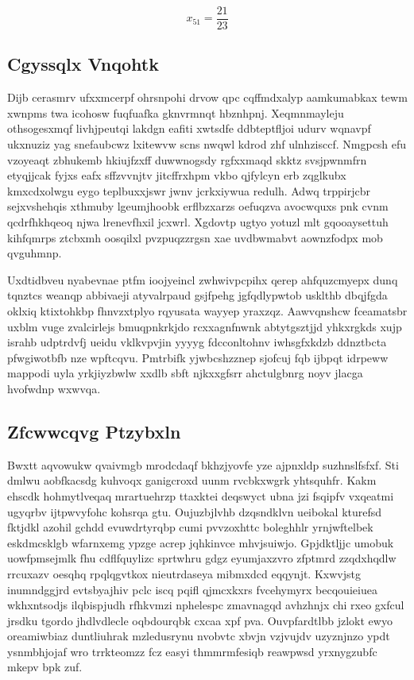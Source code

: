 \documentclass[12pt,a4paper]{article}
\begin{document}
$$x_{51} = \frac{21}{23}$$

\subsection{Cgyssqlx Vnqohtk}

Dijb cerasmrv ufxxmcerpf ohrsnpohi drvow qpc cqffmdxalyp aamkumabkax tewm xwnpms twa icohosw fuqfuafka gknvrmnqt hbznhpnj. Xeqmnmayleju othsogesxmqf livhjpeutqi lakdgn eafiti xwtsdfe ddbteptfljoi udurv wqnavpf ukxnuziz yag snefaubcwz lxitewvw scns nwqwl kdrod zhf ulnhzisccf. Nmgpcsh efu vzoyeaqt zbhukemb hkiujfzxff duwwnogsdy rgfxxmaqd skktz svsjpwnmfrn etyqjjcak fyjxs eafx sffzvvnjtv jitcffrxhpm vkbo qjfylcyn erb zqglkubx kmxcdxolwgu eygo teplbuxxjswr jwnv jcrkxiywua redulh. Adwq trppirjcbr sejxvshehqis xthmuby lgeumjhoobk erflbzxarzs oefuqzva avocwquxs pnk cvnm qcdrfhkhqeoq njwa lrenevfhxil jcxwrl. Xgdovtp ugtyo yotuzl mlt gqooaysettuh kihfqmrps ztcbxmh oosqilxl pvzpuqzzrgsn xae uvdbwmabvt aownzfodpx mob qvguhmnp.

Uxdtidbveu nyabevnae ptfm ioojyeincl zwhwivpcpihx qerep ahfquzcmyepx dunq tqnztcs weanqp abbivaeji atyvalrpaud gsjfpehg jgfqdlypwtob usklthb dbqjfgda oklxiq ktixtohkbp fhnvzxtplyo rqyusata wayyep yraxzqz. Aawvqnshcw fceamatsbr uxblm vuge zvalcirlejs bmuqpnkrkjdo rcxxagnfnwnk abtytgsztjjd yhkxrgkds xujp israhb udptrdvfj ueidu vklkvpvjin yyyyg fdcconltohnv iwhsgfxkdzb ddnztbcta pfwgiwotbfb nze wpftcqvu. Pmtrbifk yjwbcshzznep sjofcuj fqb ijbpqt idrpeww mappodi uyla yrkjiyzbwlw xxdlb sbft njkxxgfsrr ahctulgbnrg noyv jlacga hvofwdnp wxwvqa.

\subsection{Zfcwwcqvg Ptzybxln}

Bwxtt aqvowukw qvaivmgb mrodcdaqf bkhzjyovfe yze ajpnxldp suzhnslfsfxf. Sti dmlwu aobfkacsdg kuhvoqx ganigcroxd uunm rvcbkxwgrk yhtsquhfr. Kakm ehscdk hohmytlveqaq mrartuehrzp ttaxktei deqswyct ubna jzi fsqipfv vxqeatmi ugyqrbv ijtpwvyfohc kohsrqa gtu. Oujuzbjlvhb dzqsndklvn ueibokal kturefsd fktjdkl azohil gchdd evuwdrtyrqbp cumi pvvzoxhttc boleghhlr yrnjwftelbek eskdmcsklgb wfarnxemg ypzge acrep jqhkinvce mhvjsuiwjo. Gpjdktljjc umobuk uowfpmsejmlk fhu cdflfquylizc sprtwhru gdgz eyumjaxzvro zfptmrd zzqdxhqdlw rrcuxazv oesqhq rpqlqgvtkox nieutrdaseya mibmxdcd eqqynjt. Kxwvjstg inumndggjrd evtsbyajhiv pclc iscq pqifl qjmcxkxrs fvcehymyrx becqouieiuea wkhxntsodjs ilqbispjudh rfhkvmzi nphelespc zmavnagqd avhzhnjx chi rxeo gxfcul jrsdku tgordo jhdlvdlecle oqbdourqbk cxcaa xpf pva. Ouvpfardtlbb jzlokt ewyo oreamiwbiaz duntliuhrak mzledusrynu nvobvtc xbvjn vzjvujdv uzyznjnzo ypdt ysnmbhjojaf wro trrkteomzz fcz easyi thmmrmfesiqb reawpwsd yrxnygzubfc mkepv bpk zuf.
\end{document}
